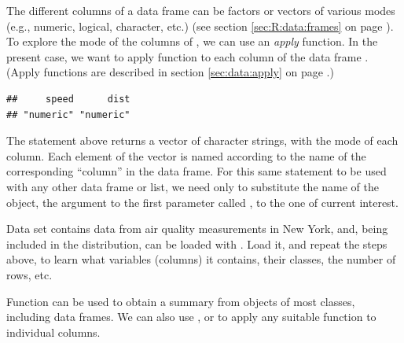 \documentclass[krantz2]{krantz}\usepackage{knitr}
\begin{document}
The different columns of a data frame can be factors or vectors of various modes (e.g.,  numeric, logical, character, etc.) (see section \ref{sec:R:data:frames} on page \pageref{sec:R:data:frames}).
To explore the mode of the columns of , we can use an \emph{apply} function. In the present case, we want to apply function  to each column of the data frame . (Apply functions are described in section \ref{sec:data:apply} on page \pageref{sec:data:apply}.)

\begin{knitrout}\footnotesize
{}\color{fgcolor}\begin{kframe}
\begin{alltt}
\hlstd{(}   
\end{alltt}
\begin{verbatim}
##     speed      dist
## "numeric" "numeric"
\end{verbatim}
\end{kframe}
\end{knitrout}

The statement above returns a vector of character strings, with the mode of each column. Each element of the vector is named according to the name of the corresponding ``column'' in the data frame. For this same statement to be used with any other data frame or list, we need only to substitute the name of the object, the argument to the first parameter called , to the one of current interest.

\begin{playground}
Data set  contains data from air quality measurements in New York, and, being included in the \Rpgrm distribution, can be loaded with . Load it, and repeat the steps above, to learn what variables (columns) it contains, their classes, the number of rows, etc.
\end{playground}

Function  can be used to obtain a summary from objects of most \Rlang classes, including data frames. We can also use ,  or  to apply any suitable function to individual columns.
\end{document}
